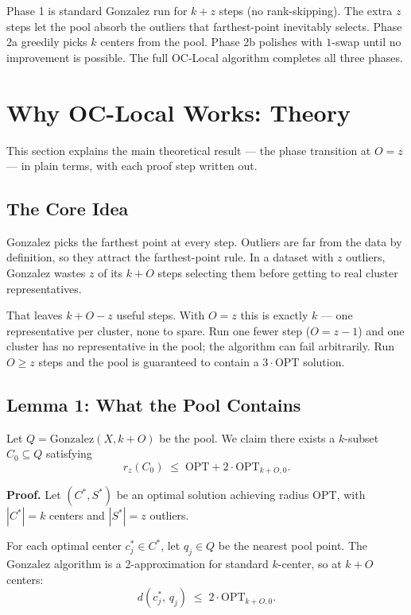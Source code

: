 \documentclass[11pt]{article}
\begin{document}
Phase 1 is standard Gonzalez run for $k+z$ steps (no rank-skipping). The extra $z$ steps let the pool absorb the outliers that farthest-point inevitably selects. Phase 2a greedily picks $k$ centers from the pool. Phase 2b polishes with $1$-swap until no improvement is possible. The full OC-Local algorithm completes all three phases.


\section{Why OC-Local Works: Theory}

This section explains the main theoretical result --- the phase transition at $O = z$ --- in plain terms, with each proof step written out.

\subsection{The Core Idea}

Gonzalez picks the farthest point at every step. Outliers are far from the data by definition, so they attract the farthest-point rule. In a dataset with $z$ outliers, Gonzalez wastes $z$ of its $k + O$ steps selecting them before getting to real cluster representatives.

That leaves $k + O - z$ useful steps. With $O = z$ this is exactly $k$ --- one representative per cluster, none to spare. Run one fewer step ($O = z-1$) and one cluster has no representative in the pool; the algorithm can fail arbitrarily. Run $O \ge z$ steps and the pool is guaranteed to contain a $3 \cdot \mathrm{OPT}$ solution.

\subsection{Lemma 1: What the Pool Contains}

Let $Q = \mathrm{Gonzalez}(X, k+O)$ be the pool. We claim there exists a $k$-subset $C_0 \subseteq Q$ satisfying
\[
r_z(C_0) \;\le\; \mathrm{OPT} + 2 \cdot \mathrm{OPT}_{k+O,0}.
\]

\textbf{Proof.} Let $(C^*, S^*)$ be an optimal solution achieving radius $\mathrm{OPT}$, with $|C^*| = k$ centers and $|S^*| = z$ outliers.

For each optimal center $c^*_j \in C^*$, let $q_j \in Q$ be the nearest pool point. The Gonzalez algorithm is a 2-approximation for standard $k$-center, so at $k+O$ centers:
\[
d(c^*_j,\, q_j) \;\le\; 2 \cdot \mathrm{OPT}_{k+O,0}.
\]
\end{document}
